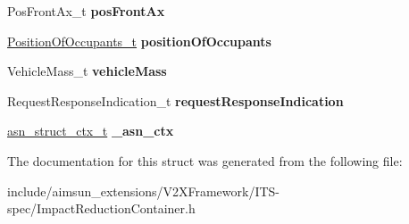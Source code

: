 \begin{DoxyCompactItemize}
\item 
Pos\+Front\+Ax\+\_\+t {\bfseries pos\+Front\+Ax}\hypertarget{structImpactReductionContainer_ac9449b8cce3c7cbdc6b43df3c5d4226c}{}\label{structImpactReductionContainer_ac9449b8cce3c7cbdc6b43df3c5d4226c}

\item 
\hyperlink{structBIT__STRING__s}{Position\+Of\+Occupants\+\_\+t} {\bfseries position\+Of\+Occupants}\hypertarget{structImpactReductionContainer_a268fe7175ee14c3dac2b9eae932a2870}{}\label{structImpactReductionContainer_a268fe7175ee14c3dac2b9eae932a2870}

\item 
Vehicle\+Mass\+\_\+t {\bfseries vehicle\+Mass}\hypertarget{structImpactReductionContainer_aad290f2c17cdbf606ed172bf6a4a8e18}{}\label{structImpactReductionContainer_aad290f2c17cdbf606ed172bf6a4a8e18}

\item 
Request\+Response\+Indication\+\_\+t {\bfseries request\+Response\+Indication}\hypertarget{structImpactReductionContainer_a0ecdb775b8993a41cff76104f8b203a2}{}\label{structImpactReductionContainer_a0ecdb775b8993a41cff76104f8b203a2}

\item 
\hyperlink{structasn__struct__ctx__s}{asn\+\_\+struct\+\_\+ctx\+\_\+t} {\bfseries \+\_\+asn\+\_\+ctx}\hypertarget{structImpactReductionContainer_aa27030a142992c18983e9bd68c8e3f16}{}\label{structImpactReductionContainer_aa27030a142992c18983e9bd68c8e3f16}

\end{DoxyCompactItemize}


The documentation for this struct was generated from the following file\+:\begin{DoxyCompactItemize}
\item 
include/aimsun\+\_\+extensions/\+V2\+X\+Framework/\+I\+T\+S-\/spec/Impact\+Reduction\+Container.\+h\end{DoxyCompactItemize}
